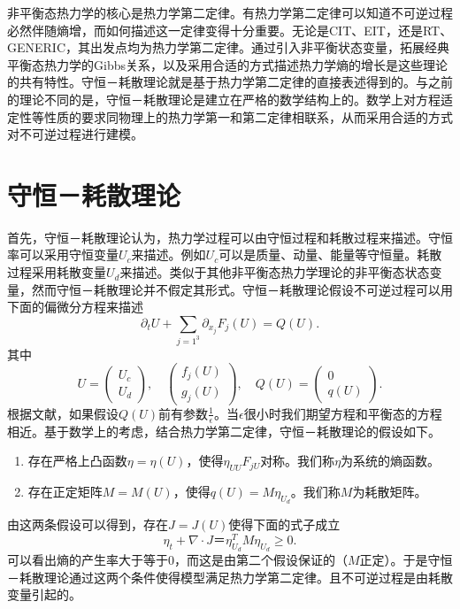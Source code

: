 \documentclass{article}
\begin{document}
 	非平衡态热力学的核心是热力学第二定律。有热力学第二定律可以知道不可逆过程必然伴随熵增，而如何描述这一定律变得十分重要。无论是CIT、EIT，还是RT、GENERIC，其出发点均为热力学第二定律。通过引入非平衡状态变量，拓展经典平衡态热力学的Gibbs关系，以及采用合适的方式描述热力学熵的增长是这些理论的共有特性。守恒－耗散理论就是基于热力学第二定律的直接表述得到的。与之前的理论不同的是，守恒－耗散理论是建立在严格的数学结构上的。数学上对方程适定性等性质的要求同物理上的热力学第一和第二定律相联系，从而采用合适的方式对不可逆过程进行建模\cite{}。
	
	\section{守恒－耗散理论}
	首先，守恒－耗散理论认为，热力学过程可以由守恒过程和耗散过程来描述。守恒率可以采用守恒变量$U_c$来描述。例如$U_c$可以是质量、动量、能量等守恒量。耗散过程采用耗散变量$U_d$来描述。类似于其他非平衡态热力学理论的非平衡态状态变量，然而守恒－耗散理论并不假定其形式。守恒－耗散理论假设不可逆过程可以用下面的偏微分方程来描述
	\begin{equation}\label{eq:CDF}
		\partial_t U + \sum_{j=1^3} \partial_{x_j} F_j(U) = Q(U) .
	\end{equation}
	其中
	\begin{equation*}
		U = \left( \begin{array}{c}
			U_c \\ U_d 
			\end{array} \right) , \quad
			 \left( \begin{array}{c}
			f_j(U) \\ g_j(U)
			\end{array} \right), \quad 
			Q(U) = \left( \begin{array}{c}
			0 \\ q(U) 
			\end{array} \right).
	\end{equation*}
	根据文献\cite{}，如果假设$Q(U)$前有参数$\frac{1}{\epsilon}$。当$\epsilon$很小时我们期望方程和平衡态的方程相近。基于数学上的考虑\cite{}，结合热力学第二定律，守恒－耗散理论的假设如下\cite{}。
	\begin{enumerate}
		\item 存在严格上凸函数$\eta = \eta (U)$，使得$\eta_{UU} F_{jU}$对称。我们称$\eta$为系统的熵函数。
		\item 存在正定矩阵$M = M(U)$，使得$q(U) = M \eta_{U_d}$。我们称$M$为耗散矩阵。
	\end{enumerate}
	由这两条假设可以得到，存在$J = J(U)$使得下面的式子成立
	\begin{equation*}
		\eta_t + \nabla \cdot J ＝ \eta_{U_d}^T M \eta_{U_d} \ge 0.
	\end{equation*}
	可以看出熵的产生率大于等于0，而这是由第二个假设保证的（$M$正定）。于是守恒－耗散理论通过这两个条件使得模型满足热力学第二定律。且不可逆过程是由耗散变量引起的\cite{}。
	
\end{document}
